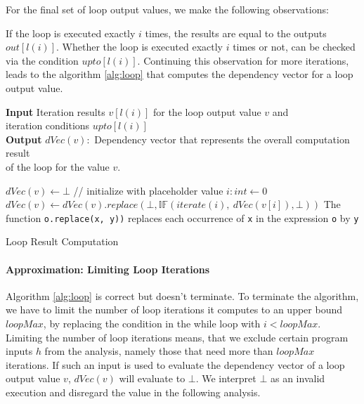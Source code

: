 For the final set of loop output values, we make the following observations:

If the loop is executed exactly $i$ times, the results are equal to the outputs $out[l(i)]$. Whether the loop is executed exactly $i$ times or not, can be checked via the condition $upto[l(i)]$. Continuing this observation for more iterations, leads to the algorithm \ref{alg:loop} that computes the dependency vector for a loop output value.

\begin{algorithm}
    \hspace*{\algorithmicindent} \textbf{Input} Iteration results $v[l(i)]$ for the loop output value $v$ and \\
    \hspace*{\algorithmicindent} iteration conditions $upto[l(i)]$ \\
    \hspace*{\algorithmicindent} \textbf{Output} $dVec(v):$ Dependency vector that represents the overall computation result\\
    \hspace*{\algorithmicindent} \hspace*{\algorithmicindent}of the loop for the value $v$. \\
    \begin{algorithmic}[1]
        \State $dVec(v) \leftarrow \bot$ // initialize with placeholder value
        \State $i: int \leftarrow 0$
        \While{$\mttt$}
            \State $dVec(v) \leftarrow dVec(v).replace(\bot, \mathbb{IF}(iterate(i), \: dVec(v[i]), \bot))$
        \EndWhile
        \State The function \texttt{o.replace(x, y))} replaces each occurrence of \texttt{x} in the expression \texttt{o} by \texttt{y}
        \end{algorithmic} 
\caption{Loop Result Computation}\label{alg:loop}
\end{algorithm}

\paragraph{Approximation: Limiting Loop Iterations}
Algorithm \ref{alg:loop} is correct but doesn't terminate. To terminate the algorithm, we have to limit the number of loop iterations it computes to an upper bound $loopMax$, by replacing the condition in the while loop with $i < loopMax$.
Limiting the number of loop iterations means, that we exclude certain program inputs $h$ from the analysis, namely those that need more than $loopMax$ iterations. If such an input is used to evaluate the dependency vector of a loop output value $v$, $dVec(v)$ will evaluate to $\bot$. We interpret $\bot$ as an invalid execution and disregard the value in the following analysis.

